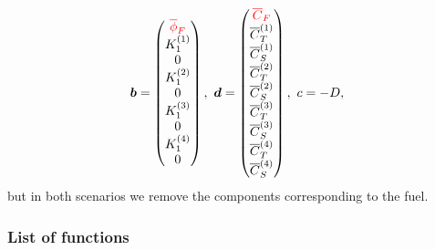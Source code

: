\documentclass[12pt]{article}
\theoremstyle{definition}
\theoremstyle{remark}
\begin{document}
\begin{equation*}
\bm{b}=\begin{pmatrix}
\color{red}\overline{\phi}_F \\
K_1^{(1)} \\
0 \\
K_1^{(2)} \\
0 \\
K_1^{(3)} \\
0 \\
K_1^{(4)} \\
0
\end{pmatrix},\ \bm{d}=\begin{pmatrix}
\color{red}\overline{C}_F \\
\overline{C}_T^{(1)} \\
\overline{C}_S^{(1)} \\
\overline{C}_T^{(2)} \\
\overline{C}_S^{(2)} \\
\overline{C}_T^{(3)} \\
\overline{C}_S^{(3)} \\
\overline{C}_T^{(4)} \\
\overline{C}_S^{(4)}
\end{pmatrix},\ c=-D,
\end{equation*}
but in both scenarios we remove the components corresponding to the fuel.

\subsubsection{List of functions}
\end{document}
